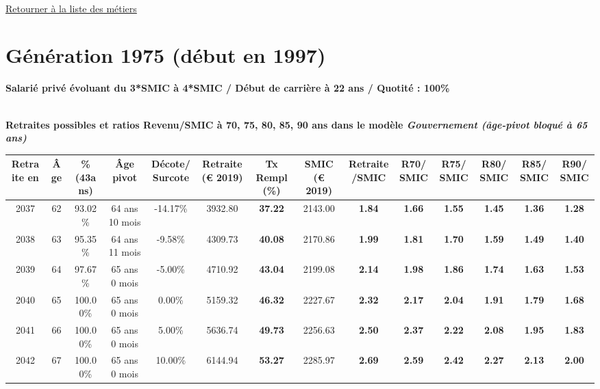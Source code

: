 

   
 \localtableofcontents 

~\\ 
 
 \hyperlink{page.2}{\noindent Retourner à la liste des métiers}

 \newpage 

\section{Génération 1975 (début en 1997)\label{Ascendant45_100_1975_22_0}} 
 
{\bf \noindent Salarié privé évoluant du 3*SMIC à 4*SMIC / Début de carrière à 22 ans / Quotité : 100\%}  ~ 

 ~\\{\bf \noindent Retraites possibles et ratios Revenu/SMIC à 70, 75, 80, 85, 90 ans dans le modèle \emph{Gouvernement (âge-pivot bloqué à 65 ans)}}  
 
\begin{adjustbox}{max width=\textwidth} 
\begin{tabular}[htb]{|c|c||c|c|c||c|c||c|c||c|c|c|c|c|} 
\hline 
 Retraite en &  Âge &  \%(43ans) &  Âge pivot &  Décote/Surcote &  Retraite (\euro{} 2019) &  Tx Rempl(\%) &  SMIC (\euro{} 2019) &  Retraite/SMIC &  R70/SMIC &  R75/SMIC &  R80/SMIC &  R85/SMIC &  R90/SMIC \\ 
\hline \hline 
 2037 &  62 &  93.02\% &  64 ans 10 mois &  -14.17\% &  3932.80 &  {\bf 37.22} &  2143.00 &  {\bf 1.84} &  {\bf 1.66} &  {\bf 1.55} &  {\bf 1.45} &  {\bf 1.36} &  {\bf 1.28} \\ 
\hline 
 2038 &  63 &  95.35\% &  64 ans 11 mois &  -9.58\% &  4309.73 &  {\bf 40.08} &  2170.86 &  {\bf 1.99} &  {\bf 1.81} &  {\bf 1.70} &  {\bf 1.59} &  {\bf 1.49} &  {\bf 1.40} \\ 
\hline 
 2039 &  64 &  97.67\% &  65 ans 0 mois &  -5.00\% &  4710.92 &  {\bf 43.04} &  2199.08 &  {\bf 2.14} &  {\bf 1.98} &  {\bf 1.86} &  {\bf 1.74} &  {\bf 1.63} &  {\bf 1.53} \\ 
\hline 
 2040 &  65 &  100.00\% &  65 ans 0 mois &  0.00\% &  5159.32 &  {\bf 46.32} &  2227.67 &  {\bf 2.32} &  {\bf 2.17} &  {\bf 2.04} &  {\bf 1.91} &  {\bf 1.79} &  {\bf 1.68} \\ 
\hline 
 2041 &  66 &  100.00\% &  65 ans 0 mois &  5.00\% &  5636.74 &  {\bf 49.73} &  2256.63 &  {\bf 2.50} &  {\bf 2.37} &  {\bf 2.22} &  {\bf 2.08} &  {\bf 1.95} &  {\bf 1.83} \\ 
\hline 
 2042 &  67 &  100.00\% &  65 ans 0 mois &  10.00\% &  6144.94 &  {\bf 53.27} &  2285.97 &  {\bf 2.69} &  {\bf 2.59} &  {\bf 2.42} &  {\bf 2.27} &  {\bf 2.13} &  {\bf 2.00} \\ 
\hline 
\hline 
\end{tabular} 
\end{adjustbox} 
 
